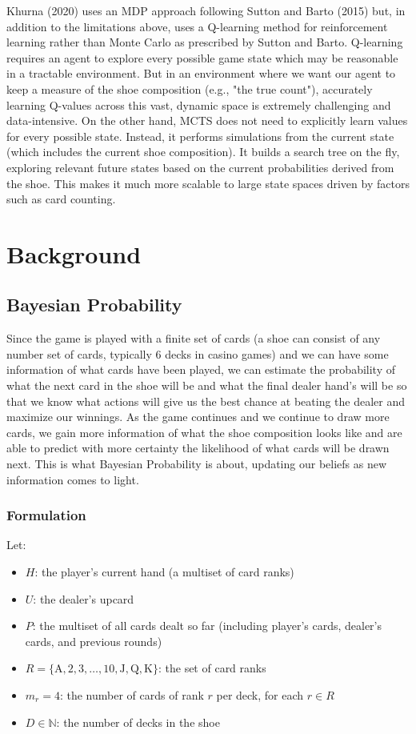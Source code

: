 \documentclass[12pt,a4paper]{cibb}
\begin{document}
Khurna (2020) uses an MDP approach following Sutton and Barto (2015) but, in addition to the limitations above, uses a Q-learning method for reinforcement learning rather than Monte Carlo as prescribed by Sutton and Barto. Q-learning requires an agent to explore every possible game state which may be reasonable in a tractable environment. But in an environment where we want our agent to keep a measure of the shoe composition (e.g., "the true count"), accurately learning Q-values across this vast, dynamic space is extremely challenging and data-intensive. On the other hand, MCTS does not need to explicitly learn values for every possible state. Instead, it performs simulations from the current state (which includes the current shoe composition). It builds a search tree on the fly, exploring relevant future states based on the current probabilities derived from the shoe. This makes it much more scalable to large state spaces driven by factors such as card counting.

\section{Background}
\label{sec:Theory}

\subsection{{Bayesian Probability}}

Since the game is played with a finite set of cards (a shoe can consist of any number set of cards, typically 6 decks in casino games) and we can have some information of what cards have been played, we can estimate the probability of what the next card in the shoe will be and what the final dealer hand's will be so that we know what actions will give us the best chance at beating the dealer and maximize our winnings. As the game continues and we continue to draw more cards, we gain more information of what the shoe composition looks like and are able to predict with more certainty the likelihood of what cards will be drawn next. This is what Bayesian Probability is about, updating our beliefs as new information comes to light.

\subsubsection{Formulation}

Let:
\begin{itemize}
  \item \(H\): the player's current hand (a multiset of card ranks)
  \item \(U\): the dealer's upcard
  \item \(P\): the multiset of all cards dealt so far (including player's cards, dealer's cards, and previous rounds)
  \item \(R = \{\mathrm{A}, 2, 3, \dots, 10, \mathrm{J}, \mathrm{Q}, \mathrm{K}\}\): the set of card ranks
  \item \(m_r = 4\): the number of cards of rank \(r\) per deck, for each \(r \in R\)
  \item \(D \in \mathbb{N}\): the number of decks in the shoe
\end{itemize}
\end{document}
